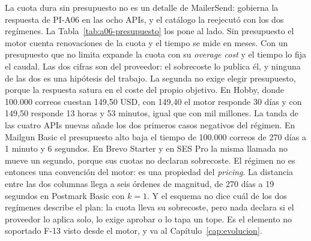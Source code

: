 La cuota dura sin presupuesto no es un detalle de MailerSend: gobierna la respuesta de PI-A06 en las ocho APIs, y el catálogo la reejecutó con los dos regímenes.
La Tabla~\ref{tab:a06-presupuesto} los pone al lado.
Sin presupuesto el motor cuenta renovaciones de la cuota y el tiempo se mide en meses. Con un presupuesto que no limita expande la cuota con su \textit{overage cost} y el tiempo lo fija el caudal.
Las dos cifras son del proveedor: el sobrecoste lo publica él, y ninguna de las dos es una hipótesis del trabajo.
La segunda no exige elegir presupuesto, porque la respuesta satura en el coste del propio objetivo.
En Hobby, donde 100.000 correos cuestan 149,50 USD, con 149,40 el motor responde 30 días y con 149,50 responde 13 horas y 53 minutos, igual que con mil millones.
La tanda de las cuatro APIs nuevas añade los dos primeros casos negativos del régimen.
En Mailgun Basic el presupuesto alto baja el tiempo de 100.000 correos de 270 días a 1 minuto y 6 segundos.
En Brevo Starter y en SES Pro la misma llamada no mueve un segundo, porque sus cuotas no declaran sobrecoste.
El régimen no es entonces una convención del motor: es una propiedad del \textit{pricing}.
La distancia entre las dos columnas llega a seis órdenes de magnitud, de 270 días a 19 segundos en Postmark Basic con $k = 1$.
Y el esquema no dice cuál de los dos regímenes describe el plan: la cuota lleva su sobrecoste, pero nada declara si el proveedor lo aplica solo, lo exige aprobar o lo tapa un tope.
Es el elemento no soportado F-13 visto desde el motor, y va al Capítulo~\ref{cap:evolucion}.

